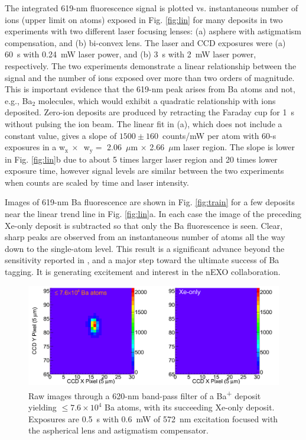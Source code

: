 The integrated 619-nm fluorescence signal is plotted vs. instantaneous number of ions (upper limit on atoms) exposed in Fig. \ref{fig:lin} for many deposits in two experiments with two different laser focusing lenses:  (a) asphere with astigmatism compensation, and (b) bi-convex lens.  The laser and CCD exposures were (a) 60~s with 0.24~mW laser power, and (b) 3~s with 2~mW laser power, respectively.  The two experiments demonstrate a linear relationship between the signal and the number of ions exposed over more than two orders of magnitude.  This is important evidence that the 619-nm peak arises from Ba atoms and not, e.g., Ba$_{2}$ molecules, which would exhibit a quadratic relationship with ions deposited.  Zero-ion deposits are produced by retracting the Faraday cup for 1~s without pulsing the ion beam.  The linear fit in (a), which does not include a constant value, gives a slope of $1500 \pm 160$~counts/mW per atom with 60-s exposures in a w$_{\text{x}}~\times$~w$_{\text{y}} =$ 2.06~$\mu$m $\times$ 2.66~$\mu$m laser region.  The slope is lower in Fig. \ref{fig:lin}b due to about 5 times larger laser region and 20 times lower exposure time, however signal levels are similar between the two experiments when counts are scaled by time and laser intensity.%

Images of 619-nm Ba fluorescence are shown in Fig. \ref{fig:train} for a few deposits near the linear trend line in Fig. \ref{fig:lin}a.  In each case the image of the preceding Xe-only deposit is subtracted so that only the Ba fluorescence is seen.  Clear, sharp peaks are observed from an instantaneous number of atoms all the way down to the single-atom level.  This result is a significant advance beyond the sensitivity reported in \cite{Mong2015}, and a major step toward the ultimate success of Ba tagging.  It is generating excitement and interest in the nEXO collaboration.


\begin{figure} %
        \centering
                \includegraphics[width=.95\textwidth]{figures/xebaxe_largest_instantaneous.png}
                \caption{Raw images through a 620-nm band-pass filter of a Ba\textsuperscript{+} deposit yielding $\leq 7.6 \times 10^{4}$ Ba atoms, with its succeeding Xe-only deposit.  Exposures are 0.5~s with 0.6~mW of 572~nm excitation focused with the aspherical lens and astigmatism compensator.}
\label{fig:xebaxeLarger}
\end{figure}

